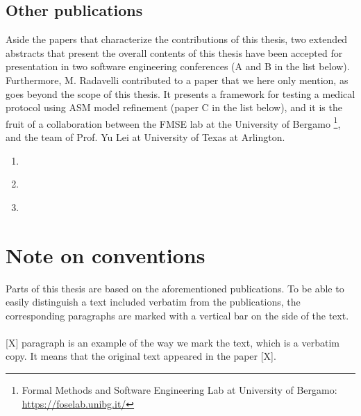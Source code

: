\subsection{Other publications}

Aside the papers that characterize the contributions of this thesis, two extended abstracts that present the overall contents of this thesis have been accepted for presentation in two software engineering conferences (A and B in the list below).
Furthermore, M. Radavelli contributed to a paper that we here only mention, as goes beyond the scope of this thesis. It presents a framework for testing a medical protocol using ASM model refinement (paper C in the list below), and it is the fruit of a collaboration between the FMSE lab at the University of Bergamo \footnote{Formal Methods and Software Engineering Lab at University of Bergamo: \url{https://foselab.unibg.it/}}, and the  team of Prof. Yu Lei at University of Texas at Arlington.

\begin{enumerate}
	\renewcommand{\theenumi}{\Alph{enumi}} %
	\item \cite{radavelli2019using} 
	
	\item \cite{Radavelli:2019:UST:3338906.3342508} 
	
	\item \cite{bonfanti_ictss_2019} 
\end{enumerate}

\section{Note on conventions}
Parts of this thesis are based on the aforementioned publications. To be able to easily distinguish a text included verbatim from the publications, the corresponding paragraphs are marked with a vertical bar on the side of the text.

\paragraph{}
\begin{tikzborder}{[X]}
 paragraph is an example of the way we mark the text, which is a verbatim copy. It means that the original text appeared in the paper [X].
\end{tikzborder}

